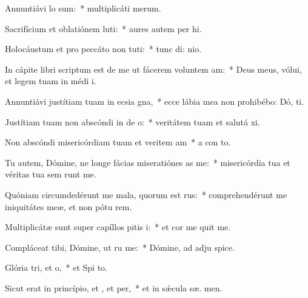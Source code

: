 \item Annuntiávi  lo sum:~* multiplicáti   merum.
\item Sacrifícium et oblatiónem luti:~* aures autem per hi.
\item Holocáustum et pro peccáto non tuti:~* tunc di:  nio.
\item In cápite libri scriptum est de me ut fácerem voluntem am:~* Deus meus, vólui, et legem tuam in médi  i.
\item Annuntiávi justítiam tuam in ecsia gna,~* ecce lábia mea non prohibébo: Dó,  ti.
\item Justítiam tuam non abscóndi in de o:~* veritátem tuam et salutá  xi.
\item Non abscóndi misericórdiam tuam et veritem am~* a con to.
\item Tu autem, Dómine, ne longe fácias miseratiónes as  me:~* misericórdia tua et véritas tua sem runt me.
\item Quóniam circumdedérunt me mala, quorum  est rus:~* comprehendérunt me iniquitátes meæ, et non pótu  rem.
\item Multiplicátæ sunt super capíllos pitis i:~* et cor me quit me.
\item Compláceat tibi, Dómine, ut ru me:~* Dómine, ad adju  spice.
\item Glória tri, et o,~* et Spi to.
\item Sicut erat in princípio, et , et per,~* et in sǽcula sæ. men.
